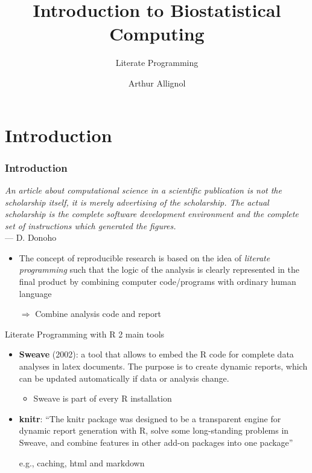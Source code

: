 \documentclass[paper=screen,mathserif]{beamer}
\title[Literate Programming]{Introduction to Biostatistical Computing}
\subtitle{Literate Programming}
\author{Arthur Allignol}
\institute[]{\scriptsize{\url{arthur.allignol@uni-ulm.de}}}
\date{}
\begin{document}
\newcommand{\titlep}{yes}  %

{
\renewcommand{\insertframenumber}{}   %
\begin{frame}
\addtocounter{framenumber}{-1}
\titlepage
\end{frame}
}


\section{Introduction}

\begin{frame}
  \frametitle{Introduction}
{\em An article about computational science in a scientific
  publication is not the scholarship itself, it is merely advertising
  of the scholarship. The actual scholarship is the complete software
  development environment and the complete set of instructions which
  generated the figures.}\\
--- D. Donoho

\begin{itemize}
\item The concept of reproducible research is based on the idea of
  {\em literate programming} such that the logic of the analysis is
  clearly represented in the final product by combining computer
  code/programs with ordinary human language

  $\Rightarrow$ Combine analysis code and report
\end{itemize}
\end{frame}

\begin{frame}{Literate Programming with R}
  2 main tools
  \begin{itemize}
  \item {\bf Sweave} (2002): a tool that allows to embed the R code for
    complete data analyses in latex documents. The purpose is to
    create dynamic reports, which can be updated automatically if data
    or analysis change.
    \begin{itemize}
    \item Sweave is part of every R installation
    \end{itemize}
  \item {\bf knitr}: ``The knitr package was designed to be a
    transparent engine for dynamic report generation with R, solve
    some long-standing problems in Sweave, and combine features in
    other add-on packages into one package''

    e.g., caching, html and markdown
  \end{itemize}
\end{frame}
\end{document}
